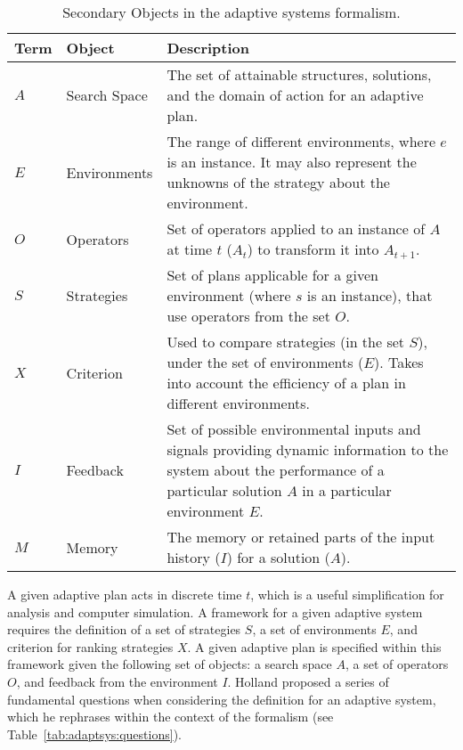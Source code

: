 \begin{table}[ht]
	\centering\small
		\begin{tabularx}{\textwidth}{llX}
		\toprule
		\textbf{Term} & \textbf{Object} & \textbf{Description} \\ 
		\toprule
		$A$ & Search Space & The set of attainable structures, solutions, and the domain of action for an adaptive plan. \\ 
		\midrule
		$E$ & Environments & The range of different environments, where $e$ is an instance. It may also represent the unknowns of the strategy about the environment.  \\ 
		\midrule
		$O$ & Operators & Set of operators applied to an instance of $A$ at time $t$ ($A_t$) to transform it into $A_{t+1}$. \\ 
		\midrule
		$S$ & Strategies & Set of plans applicable for a given environment (where $s$ is an instance), that use operators from the set $O$.  \\ 
		\midrule
		$X$ & Criterion & Used to compare strategies (in the set $S$), under the set of environments ($E$). Takes into account the efficiency of a plan in different environments. \\ 
		\midrule
		$I$ & Feedback & Set of possible environmental inputs and signals providing dynamic information to the system about the performance of a particular solution $A$ in a particular environment $E$. \\ 
		\midrule
		$M$ & Memory & The memory or retained parts of the input history ($I$) for a solution ($A$). \\ 
		\bottomrule		
		\end{tabularx}	
	\caption{Secondary Objects in the adaptive systems formalism.}
	\label{tab:adaptsys:secondary}
\end{table}

A given adaptive plan acts in discrete time $t$, which is a useful simplification for analysis and computer simulation. A framework for a given adaptive system requires the definition of a set of strategies $S$, a set of environments $E$, and criterion for ranking strategies $X$. A given adaptive plan is specified within this framework given the following set of objects: a search space $A$, a set of operators $O$, and feedback from the environment $I$. Holland proposed a series of fundamental questions when considering the definition for an adaptive system, which he rephrases within the context of the formalism (see Table~\ref{tab:adaptsys:questions}).

